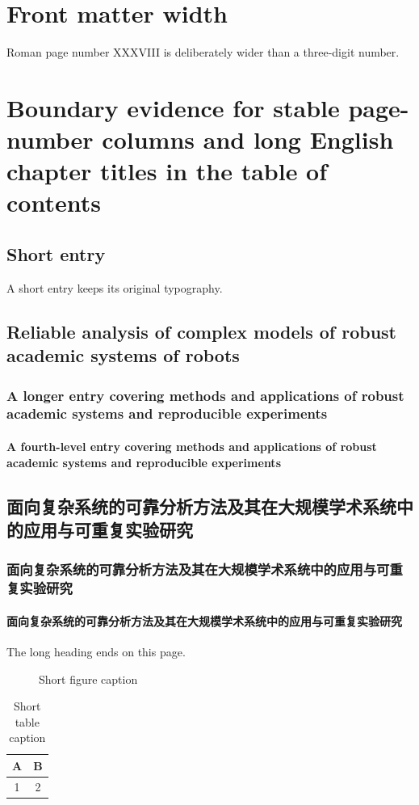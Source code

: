 \documentclass[tocdepth3]{uestcthesis}
\begin{document}
\uestcfrontmatter
\setcounter{page}{38}
\chapter*{Front matter width}
Roman page number XXXVIII is deliberately wider than a three-digit number.
\uestctableofcontents
\uestclistoffigures
\uestclistoftables
\uestcmainmatter
\setcounter{chapter}{9}
\chapter{Boundary evidence for stable page-number columns and long English chapter titles in the table of contents}
\section{Short entry}
\label{sec:f01-short}
\noindent A short entry keeps its original typography.
\clearpage
\setcounter{page}{99}
\setcounter{section}{9}
\ifdefined\FOneEnglish
  \section{Reliable analysis of complex models of robust academic systems of robots}
  \subsection{A longer entry covering methods and applications of robust academic systems and reproducible experiments}
  \subsubsection{A fourth-level entry covering methods and applications of robust academic systems and reproducible experiments}
\else
  \section{面向复杂系统的可靠分析方法及其在大规模学术系统中的应用与可重复实验研究}
  \subsection{面向复杂系统的可靠分析方法及其在大规模学术系统中的应用与可重复实验研究}
  \subsubsection{面向复杂系统的可靠分析方法及其在大规模学术系统中的应用与可重复实验研究}
\fi
\label{sec:f01-long}
\noindent The long heading ends on this page.
\clearpage
\setcounter{page}{100}
\begin{figure}[H]
  \centering\fbox{\rule{0pt}{1cm}\rule{3cm}{0pt}}
  \caption{Short figure caption}\label{fig:f01-short}
\end{figure}
\begin{table}[H]
  \centering\caption{Short table caption}\label{tab:f01-short}
  \begin{tabular}{cc}\toprule A & B \\\midrule 1 & 2 \\\bottomrule\end{tabular}
\end{table}
\clearpage
\setcounter{page}{999}
\end{document}
